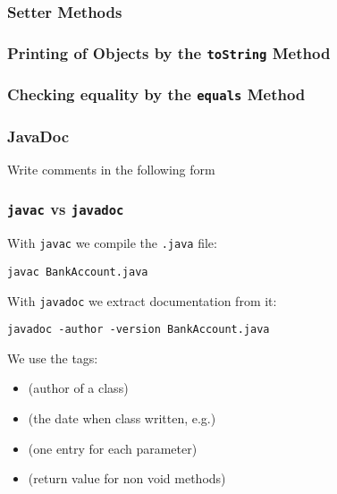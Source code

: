 \documentclass{beamer}
\def\mcolor#1#2{\rule{0ex}{0ex}\color{#1}#2\color{black}{}}
\begin{document}
\begin{frame}
\frametitle{Setter Methods}
\renewcommand{\baselinestretch}{0.7}\small\normalsize

\end{frame}


\begin{frame}
\frametitle{Printing of Objects by the \texttt{toString} Method}

\end{frame}

\begin{frame}
\frametitle{Checking equality by the \texttt{equals} Method}

\end{frame}


\begin{frame}
\frametitle{JavaDoc}\renewcommand{\baselinestretch}{0.9}\small\normalsize
  Write comments in the following form

\end{frame}


\begin{frame}
  \frametitle{\texttt{javac} vs \texttt{javadoc}}

With \texttt{javac} we compile the \texttt{.java} file:\\
\mcolor{blue}{\texttt{javac BankAccount.java}}

With \texttt{javadoc} we extract documentation from it:\\
\mcolor{blue}{\texttt{javadoc -author -version BankAccount.java}}

We use the tags:
\begin{itemize}
\item \color{blue}{}\texttt{\@author}\color{black}\quad (author of a class)
\item \color{blue}{}\texttt{\@version}\color{black}\quad (the date when class written, e.g.)
\item \color{blue}{}\texttt{\@param}\color{black}\quad (one entry for each parameter)
\item \color{blue}{}\texttt{\@return}\color{black}\quad (return value for non void methods)
\end{itemize}
\end{frame}
\end{document}
